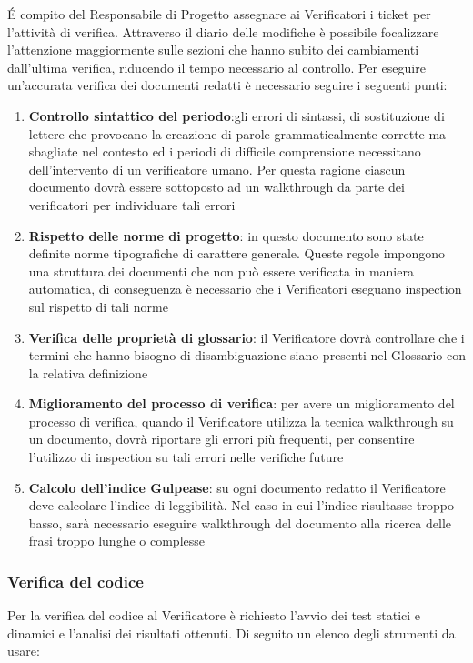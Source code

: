 \'E compito del Responsabile di Progetto assegnare ai Verificatori i ticket per l'attività di verifica. Attraverso il diario delle modifiche è possibile focalizzare l’attenzione maggiormente sulle sezioni che hanno subito dei cambiamenti dall’ultima verifica, riducendo il tempo necessario al controllo.
Per eseguire un’accurata verifica dei documenti redatti è necessario seguire i seguenti
punti:
\begin{enumerate}
	\item \textbf{Controllo sintattico del periodo}:gli errori di sintassi, di sostituzione di lettere che provocano la creazione di parole grammaticalmente corrette ma sbagliate nel
	contesto ed i periodi di difficile comprensione necessitano dell’intervento di un verificatore umano. Per questa ragione ciascun documento dovrà essere sottoposto
	ad un walkthrough da parte dei verificatori per individuare tali errori
	\item \textbf{Rispetto delle norme di progetto}: in questo documento sono state definite
	norme tipografiche di carattere generale. Queste regole impongono una struttura
	dei documenti che non può essere verificata in maniera automatica, di conseguenza è necessario che i Verificatori eseguano inspection sul rispetto di tali norme
	\item \textbf{Verifica delle proprietà di glossario}: il Verificatore dovrà controllare che
	i termini che hanno bisogno di disambiguazione siano presenti nel Glossario con la relativa definizione
	\item \textbf{Miglioramento del processo di verifica}: per avere un miglioramento del
	processo di verifica, quando il Verificatore utilizza la tecnica walkthrough su un
	documento, dovrà riportare gli errori più frequenti, per consentire l’utilizzo di
	inspection su tali errori nelle verifiche future
	\item \textbf{Calcolo dell’indice Gulpease}: su ogni documento redatto il Verificatore deve calcolare l’indice di leggibilità. Nel caso in cui l’indice risultasse troppo basso, sarà necessario eseguire walkthrough del documento alla ricerca delle frasi troppo lunghe o complesse
\end{enumerate}

\subsubsection{Verifica del codice} 
Per la verifica del codice al Verificatore è richiesto l’avvio dei test statici e dinamici e l’analisi dei risultati ottenuti.
Di seguito un elenco degli strumenti da usare: 

